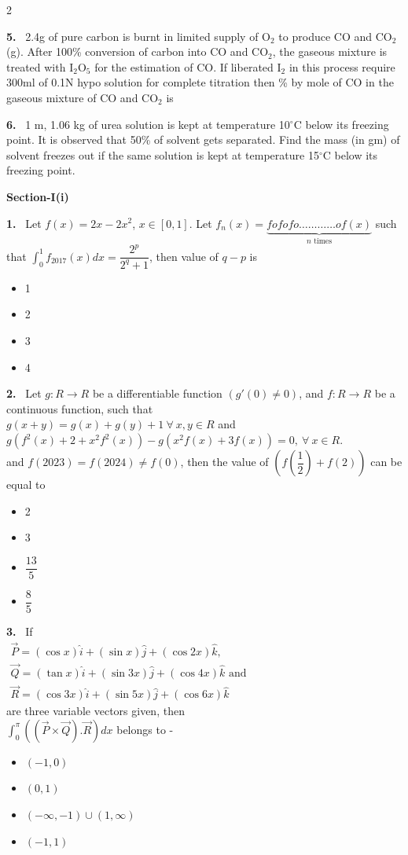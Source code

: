 \documentclass[10pt]{extarticle}
\newcommand{\partsec}[2]{\par\medskip\noindent{\large\bfseries PART-#1: #2}\par\smallskip}
\newcommand{\sect}[1]{\par\smallskip\noindent\textbf{#1}\par}
\newcommand{\qn}[1]{\par\smallskip\noindent\textbf{#1.}~}
\newenvironment{qoptions}{\begin{itemize}[leftmargin=1.8em,itemsep=1pt,topsep=2pt,label={}]}{\end{itemize}}
\newcommand{\opt}[2]{\item[(#1)] #2}
\begin{document}
\begin{multicols}{2}
\qn{5} 2.4g of pure carbon is burnt in limited supply of O$_2$ to produce CO and CO$_2$(g). After 100\% conversion of carbon into CO and CO$_2$, the gaseous mixture is treated with I$_2$O$_5$ for the estimation of CO. If liberated I$_2$ in this process require 300ml of 0.1N hypo solution for complete titration then \% by mole of CO in the gaseous mixture of CO and CO$_2$ is \underline{\hspace{1cm}}

\qn{6} 1 m, 1.06 kg of urea solution is kept at temperature 10$^\circ$C below its freezing point. It is observed that 50\% of solvent gets separated. Find the mass (in gm) of solvent freezes out if the same solution is kept at temperature 15$^\circ$C below its freezing point.

\partsec{3}{MATHEMATICS}
\sect{Section-I(i)}

\qn{1} Let $f(x)=2x-2x^2$, $x\in[0,1]$. Let $f_n(x)=\underbrace{fofofo\dots\dots\dots\dots of(x)}_{n\text{ times}}$ such that $\displaystyle\int_0^1f_{2017}(x)dx=\dfrac{2^p}{2^q+1}$, then value of $q-p$ is
\begin{qoptions}
\opt{A}{1}
\opt{B}{2}
\opt{C}{3}
\opt{D}{4}
\end{qoptions}

\qn{2} Let $g:R\to R$ be a differentiable function $(g'(0)\neq0)$, and $f:R\to R$ be a continuous function, such that\\
$g(x+y)=g(x)+g(y)+1\ \forall\ x,y\in R$ and\\
$g\left(f^2(x)+2+x^2f^2(x)\right)-g\left(x^2f(x)+3f(x)\right)=0,\ \forall\ x\in R$.\\
and $f(2023)=f(2024)\neq f(0)$, then the value of $\left(f\left(\dfrac12\right)+f(2)\right)$ can be equal to
\begin{qoptions}
\opt{A}{2}
\opt{B}{3}
\opt{C}{$\dfrac{13}5$}
\opt{D}{$\dfrac85$}
\end{qoptions}

\qn{3} If\\
{\footnotesize $\begin{array}{l}\vec P=(\cos x)\hat i+(\sin x)\hat j+(\cos2x)\hat k,\\ \vec Q=(\tan x)\hat i+(\sin3x)\hat j+(\cos4x)\hat k\text{ and}\\ \vec R=(\cos3x)\hat i+(\sin5x)\hat j+(\cos6x)\hat k\end{array}$}\\
are three variable vectors given, then\\ $\displaystyle\int_0^\pi\left(\left(\vec P\times\vec Q\right).\vec R\right)dx$ belongs to -
\begin{qoptions}
\opt{A}{$(-1,0)$}
\opt{B}{$(0,1)$}
\opt{C}{$(-\infty,-1)\cup(1,\infty)$}
\opt{D}{$(-1,1)$}
\end{qoptions}


\end{multicols}
\end{document}
